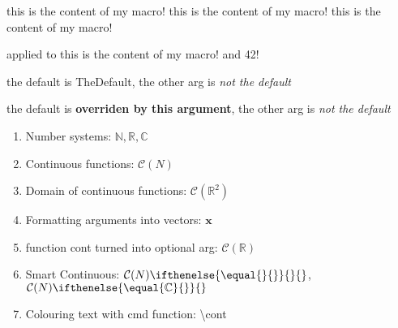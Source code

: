 \documentclass{article}
\newcommand{\mymacro}{this is the content of my macro!}
\newcommand{\macrowithArgs}[2]{applied to #1 and #2!}
\newcommand{\macrowitheDefault}[2][TheDefault]{the default is #1, the other arg is #2}
\newcommand{\numN}{\mathbb{N}}
\newcommand{\numR}{\mathbb{R}}
\newcommand{\numC}{\mathbb{C}}
\newcommand{\cont}[1][N]{\mathcal{C}(#1)}
\newcommand{\contOn}[1]{\mathcal{C}(#1)}
\newcommand{\vect}[1]{\mathbf{#1}}
\newcommand{\smartCont}[1][{}]{\cont{}\ifthenelse{\equal{#1}{}}{}}
\newcommand{\cmd}[1]{\color{blue}\textbackslash{#1}}
\begin{document}
\mymacro{}  \mymacro{}  \mymacro{}\par
\macrowithArgs{\mymacro}{42}\par
\macrowitheDefault{\emph{not the default}}\par

\macrowitheDefault[\textbf{overriden by this argument}]%
{\emph{not the default}}

\begin{enumerate}
\item Number systems: $\numN, \numR, \numC$
\item Continuous functions: $\cont{}$
\item Domain of continuous functions: $\contOn{\numR^2}$
\item Formatting arguments into vectors: $\vect{x}$
\item function cont turned into optional arg: $\cont[\numR]$
\item Smart Continuous: $\smartCont{}$, $\smartCont[\numC]$
\item Colouring text with cmd function: \cmd{cont}
\end{enumerate}
\end{document}
